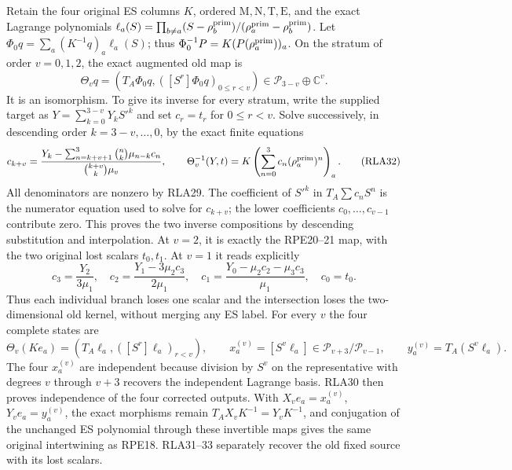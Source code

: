 Retain the four original ES columns $K$, ordered
$\mathrm M,\mathrm N,\mathrm T,\mathrm E$, and the exact Lagrange
polynomials
$\ell_a(S)=\prod_{b\ne a}(S-\rho_b^{\rm prim})/
(\rho_a^{\rm prim}-\rho_b^{\rm prim})$.
Let $\Phi_0q=\sum_a(K^{-1}q)_a\ell_a(S)$; thus
$\Phi_0^{-1}P=K(P(\rho_a^{\rm prim}))_a$.
On the stratum of order $v=0,1,2$, the exact augmented old map is
\[
 \Theta_vq=\left(T_A\Phi_0q,
          ([S^r]\Phi_0q)_{0\le r<v}\right)
   \in\mathcal P_{3-v}\oplus\mathbb C^v.
 \tag{RLA31}
\]
It is an isomorphism.  To give its inverse for every stratum,
write the supplied target as $Y=\sum_{k=0}^{3-v}Y_kS'^k$ and
set $c_r=t_r$ for $0\le r<v$.  Solve successively, in descending
order $k=3-v,\ldots,0$, by the exact finite equations
\[
 c_{k+v}=\frac{Y_k-
       \sum_{n=k+v+1}^3\binom nk\mu_{n-k}c_n}
                   {\binom{k+v}{k}\mu_v},\qquad
 \Theta_v^{-1}(Y,t)=K\left(\sum_{n=0}^3c_n
                                    (\rho_a^{\rm prim})^n\right)_a.
 \tag{RLA32}
\]
All denominators are nonzero by RLA29.
The coefficient of $S'^k$ in $T_A\sum c_nS^n$ is the numerator
equation used to solve for $c_{k+v}$; the lower coefficients
$c_0,\ldots,c_{v-1}$ contribute zero.  This proves the two inverse
compositions by descending substitution and interpolation.
At $v=2$, it is exactly the RPE20--21 map, with the two original
lost scalars $t_0,t_1$.  At $v=1$ it reads explicitly
\[
 c_3=\frac{Y_2}{3\mu_1},\quad
 c_2=\frac{Y_1-3\mu_2c_3}{2\mu_1},\quad
 c_1=\frac{Y_0-\mu_2c_2-\mu_3c_3}{\mu_1},\quad c_0=t_0.
 \tag{RLA33}
\]
Thus each individual branch loses one scalar and the intersection
loses the two-dimensional old kernel, without merging any ES label.
For every $v$ the four complete states are
\[
 \Theta_v(Ke_a)=
 \left(T_A\ell_a,([S^r]\ell_a)_{r<v}\right),\qquad
 x_a^{(v)}=[S^v\ell_a]\in\mathcal P_{v+3}/\mathcal P_{v-1},\qquad
 y_a^{(v)}=T_A(S^v\ell_a).
 \tag{RLA34}
\]
The four $x_a^{(v)}$ are independent because division by $S^v$
on the representative with degrees $v$ through $v+3$ recovers
the independent Lagrange basis.  RLA30 then proves independence
of the four corrected outputs.  With $X_ve_a=x_a^{(v)}$,
$Y_ve_a=y_a^{(v)}$, the exact morphisms remain
$T_AX_vK^{-1}=Y_vK^{-1}$, and conjugation of the unchanged ES
polynomial through these invertible maps gives the same original
intertwining as RPE18.  RLA31--33 separately recover the old
fixed source with its lost scalars.

